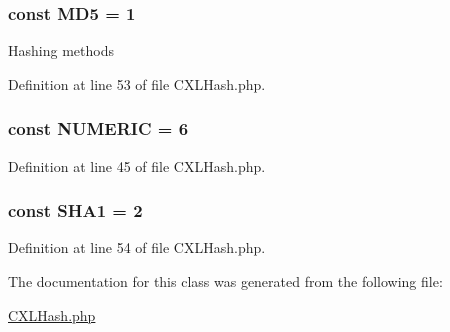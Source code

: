 \hypertarget{classCXLHash_a66be2064e952a39f04c0a54d83d1c779}{
\subsubsection[{MD5}]{\setlength{\rightskip}{0pt plus 5cm}const {\bf MD5} = 1}}
\label{classCXLHash_a66be2064e952a39f04c0a54d83d1c779}
Hashing methods 

Definition at line 53 of file CXLHash.php.

\hypertarget{classCXLHash_a19cabff2391d99103d1bf11b0ed2972e}{
\subsubsection[{NUMERIC}]{\setlength{\rightskip}{0pt plus 5cm}const {\bf NUMERIC} = 6}}
\label{classCXLHash_a19cabff2391d99103d1bf11b0ed2972e}


Definition at line 45 of file CXLHash.php.

\hypertarget{classCXLHash_a1ca7a04dcc397e382e3a4ee5e0e1b9a1}{
\subsubsection[{SHA1}]{\setlength{\rightskip}{0pt plus 5cm}const {\bf SHA1} = 2}}
\label{classCXLHash_a1ca7a04dcc397e382e3a4ee5e0e1b9a1}


Definition at line 54 of file CXLHash.php.



The documentation for this class was generated from the following file:\begin{DoxyCompactItemize}
\item 
\hyperlink{CXLHash_8php}{CXLHash.php}\end{DoxyCompactItemize}
